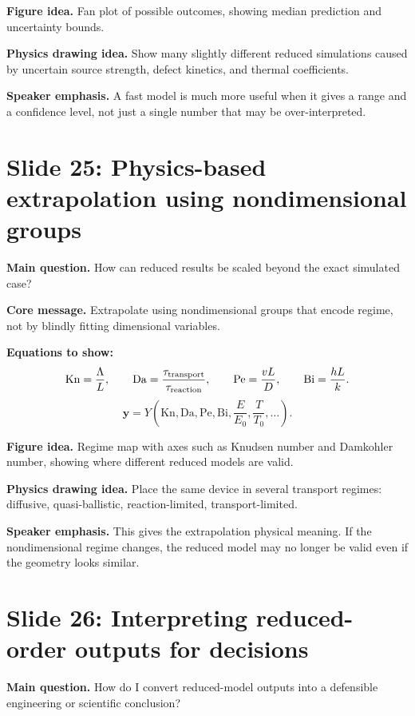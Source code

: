 \documentclass[11pt]{article}
\begin{document}
\textbf{Figure idea.} Fan plot of possible outcomes, showing median prediction and uncertainty bounds.

\textbf{Physics drawing idea.} Show many slightly different reduced simulations caused by uncertain source strength, defect kinetics, and thermal coefficients.

\textbf{Speaker emphasis.} A fast model is much more useful when it gives a range and a confidence level, not just a single number that may be over-interpreted.

\section{Slide 25: Physics-based extrapolation using nondimensional groups}
\begin{physicsbox}
\textbf{Main question.} How can reduced results be scaled beyond the exact simulated case?
\end{physicsbox}

\textbf{Core message.} Extrapolate using nondimensional groups that encode regime, not by blindly fitting dimensional variables.

\textbf{Equations to show:}
\begin{equation*}
\mathrm{Kn}=\frac{\Lambda}{L},
\qquad
\mathrm{Da}=\frac{\tau_{\mathrm{transport}}}{\tau_{\mathrm{reaction}}},
\qquad
\mathrm{Pe}=\frac{vL}{D},
\qquad
\mathrm{Bi}=\frac{hL}{k}.
\end{equation*}
\begin{equation*}
\mathbf{y}=Y\left(\mathrm{Kn},\mathrm{Da},\mathrm{Pe},\mathrm{Bi},\frac{E}{E_0},\frac{T}{T_0},\ldots\right).
\end{equation*}

\textbf{Figure idea.} Regime map with axes such as Knudsen number and Damkohler number, showing where different reduced models are valid.

\textbf{Physics drawing idea.} Place the same device in several transport regimes: diffusive, quasi-ballistic, reaction-limited, transport-limited.

\textbf{Speaker emphasis.} This gives the extrapolation physical meaning. If the nondimensional regime changes, the reduced model may no longer be valid even if the geometry looks similar.

\section{Slide 26: Interpreting reduced-order outputs for decisions}
\begin{physicsbox}
\textbf{Main question.} How do I convert reduced-model outputs into a defensible engineering or scientific conclusion?
\end{physicsbox}
\end{document}
